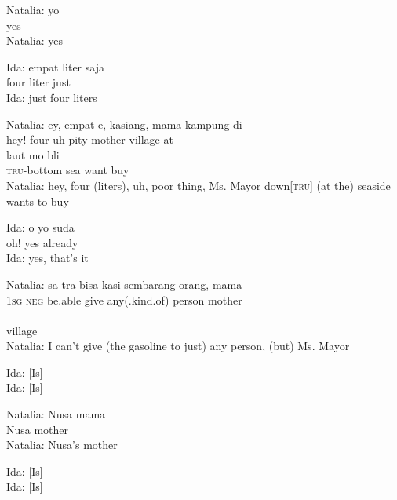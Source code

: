 \ea
\gll   Natalia:   yo\\
 {} yes\\
\glt
Natalia: yes
\z

\ea
\gll   Ida:   empat   liter   saja\\
{}  four   liter   just\\
\glt
Ida: just four liters
\z

\ea
\gll   Natalia:    {ey,}    {empat}    {e,}   kasiang,   mama   kampung   di\\
 {}  {hey!}    {four}    {uh}   pity   mother   village   at\\
    {laut}    {mo}    {bli}\\
   {\textsc{tru}{}-bottom}    {sea}    {want}    {buy}\\
\glt
Natalia: hey, four (liters), uh, poor thing, Ms. Mayor down[\textsc{tru}] (at the) seaside wants to buy
\z

\ea
\gll   Ida:   o   yo   suda\\
 {}    oh!   yes   already\\
\glt
Ida: yes, that’s it
\z

\ea
\gll   Natalia:   sa   tra   bisa   kasi   sembarang   orang,   mama\\
{}  \textsc{1sg}   \textsc{neg}   be.able   give   any(.kind.of)   person   mother\\
\\
   {village}\\
\glt
Natalia: I can’t give (the gasoline to just) any person, (but) Ms. Mayor
\z

\ea
\gll   Ida:   [Is]\\
Ida: [Is]\\
\z

\ea
\gll   Natalia:   Nusa   mama\\
  {}   Nusa   mother\\
\glt
Natalia: Nusa’s mother
\z

\ea
\gll   Ida:   [Is]\\
Ida: [Is]\\
\z

